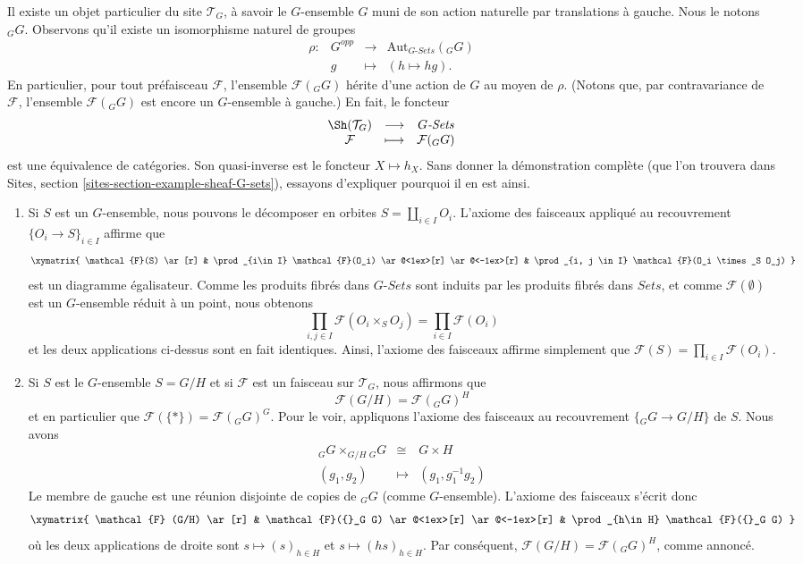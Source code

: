 \medskip\noindent
Il existe un objet particulier du site $\mathcal{T}_G$, \`a savoir le $G$-ensemble $G$
muni de son action naturelle par translations \`a gauche. Nous le notons ${}_G G$.
Observons qu'il existe un isomorphisme naturel de groupes
$$
\begin{matrix}
\rho : & G^{opp} & \longrightarrow & \text{Aut}_{G\textit{-Sets}}({}_G G) \\
& g & \longmapsto & (h \mapsto hg).
\end{matrix}
$$
En particulier, pour tout pr\'efaisceau $\mathcal{F}$, l'ensemble $\mathcal{F}({}_G G)$
h\'erite d'une action de $G$ au moyen de $\rho$. (Notons que, par contravariance de
$\mathcal{F}$, l'ensemble $\mathcal{F}({}_G G)$ est encore un $G$-ensemble \`a gauche.) En fait,
le foncteur
$$
\begin{matrix}
\Sh(\mathcal{T}_G) & \longrightarrow & G\textit{-Sets} \\
\mathcal{F} & \longmapsto & \mathcal{F}({}_G G)
\end{matrix}
$$
est une \'equivalence de cat\'egories. Son quasi-inverse est le foncteur $X \mapsto
h_X$. Sans donner la d\'emonstration compl\`ete (que l'on trouvera dans
Sites, section \ref{sites-section-example-sheaf-G-sets}),
essayons d'expliquer pourquoi il en est ainsi.
\begin{enumerate}
\item
Si $S$ est un $G$-ensemble, nous pouvons le d\'ecomposer en orbites $S = \coprod_{i\in I}
O_i$. L'axiome des faisceaux appliqu\'e au recouvrement $\{O_i \to S\}_{i\in I}$ affirme que
$$
\xymatrix{
\mathcal{F}(S) \ar[r] &
\prod_{i\in I} \mathcal{F}(O_i) \ar@<1ex>[r] \ar@<-1ex>[r] &
\prod_{i, j \in I} \mathcal{F}(O_i \times_S O_j)
}
$$
est un diagramme \'egalisateur. Comme les produits fibr\'es dans $G\textit{-Sets}$
sont induits par les produits fibr\'es dans $\textit{Sets}$, et comme
$\mathcal{F}(\emptyset)$ est un $G$-ensemble r\'eduit \`a un point, nous obtenons
$$
\prod_{i, j \in I} \mathcal{F}(O_i \times_S O_j) = \prod_{i \in I}
\mathcal{F}(O_i)
$$
et les deux applications ci-dessus sont en fait identiques. Ainsi, l'axiome des faisceaux affirme simplement
que $\mathcal{F}(S) = \prod_{i\in I} \mathcal{F}(O_i)$.
\item
Si $S$ est le $G$-ensemble $S= G/H$ et si $\mathcal{F}$ est un faisceau sur $\mathcal{T}_G$,
nous affirmons que
$$
\mathcal{F}(G/H) = \mathcal{F}({}_G G)^H
$$
et en particulier que $\mathcal{F}(\{*\}) = \mathcal{F}({}_G G)^G$. Pour le voir,
appliquons l'axiome des faisceaux au recouvrement $\{ {}_G G \to G/H \}$ de $S$. Nous
avons
\begin{eqnarray*}
{}_G G \times_{G/H} {}_G G & \cong & G \times H \\
(g_1, g_2) & \longmapsto & (g_1, g_1^{-1} g_2)
\end{eqnarray*}
Le membre de gauche est une r\'eunion disjointe de copies de ${}_G G$ (comme $G$-ensemble). L'axiome des faisceaux
s'\'ecrit donc
$$
\xymatrix{
\mathcal{F} (G/H) \ar[r] &
\mathcal{F}({}_G G) \ar@<1ex>[r] \ar@<-1ex>[r] &
\prod_{h\in H} \mathcal{F}({}_G G)
}
$$
o\`u les deux applications de droite sont $s \mapsto (s)_{h \in H}$ et $s \mapsto
(hs)_{h \in H}$. Par cons\'equent, $\mathcal{F}(G/H) = \mathcal{F}({}_G G)^H$, comme
annonc\'e.
\end{enumerate}
